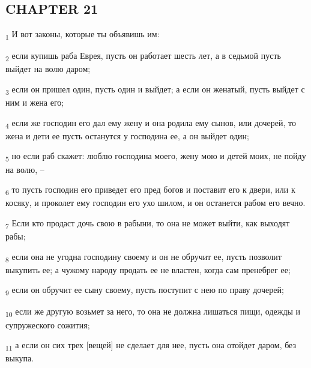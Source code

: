 \subsection{CHAPTER 21}
\begin{tcolorbox}
\textsubscript{1} И вот законы, которые ты объявишь им:
\end{tcolorbox}
\begin{tcolorbox}
\textsubscript{2} если купишь раба Еврея, пусть он работает шесть лет, а в седьмой пусть выйдет на волю даром;
\end{tcolorbox}
\begin{tcolorbox}
\textsubscript{3} если он пришел один, пусть один и выйдет; а если он женатый, пусть выйдет с ним и жена его;
\end{tcolorbox}
\begin{tcolorbox}
\textsubscript{4} если же господин его дал ему жену и она родила ему сынов, или дочерей, то жена и дети ее пусть останутся у господина ее, а он выйдет один;
\end{tcolorbox}
\begin{tcolorbox}
\textsubscript{5} но если раб скажет: люблю господина моего, жену мою и детей моих, не пойду на волю, --
\end{tcolorbox}
\begin{tcolorbox}
\textsubscript{6} то пусть господин его приведет его пред богов и поставит его к двери, или к косяку, и проколет ему господин его ухо шилом, и он останется рабом его вечно.
\end{tcolorbox}
\begin{tcolorbox}
\textsubscript{7} Если кто продаст дочь свою в рабыни, то она не может выйти, как выходят рабы;
\end{tcolorbox}
\begin{tcolorbox}
\textsubscript{8} если она не угодна господину своему и он не обручит ее, пусть позволит выкупить ее; а чужому народу продать ее не властен, когда сам пренебрег ее;
\end{tcolorbox}
\begin{tcolorbox}
\textsubscript{9} если он обручит ее сыну своему, пусть поступит с нею по праву дочерей;
\end{tcolorbox}
\begin{tcolorbox}
\textsubscript{10} если же другую возьмет за него, то она не должна лишаться пищи, одежды и супружеского сожития;
\end{tcolorbox}
\begin{tcolorbox}
\textsubscript{11} а если он сих трех [вещей] не сделает для нее, пусть она отойдет даром, без выкупа.
\end{tcolorbox}
